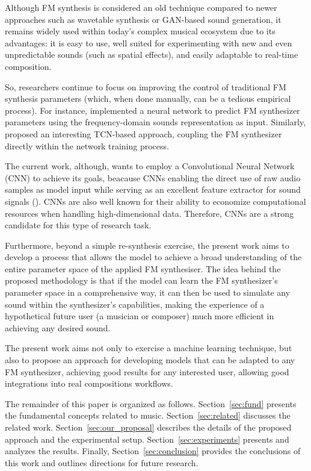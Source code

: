 \documentclass[sigconf,natbib=false]{acmart}
\begin{document}
Although FM synthesis is considered an old technique compared to newer approaches such as wavetable synthesis or GAN-based sound generation, it remains widely used within today’s complex musical ecosystem due to its advantages: it is easy to use, well suited for experimenting with new and even unpredictable sounds (such as spatial effects), and easily adaptable to real-time composition.

So, researchers continue to focus on improving the control of traditional FM synthesis parameters (which, when done manually, can be a tedious empirical process). For instance, \textcite{claesson2021resynthesis} implemented a neural network to predict FM synthesizer parameters using the frequency-domain sounds representation as input. Similarly, \textcite{steinmetz2022ddx7} proposed an interesting TCN-based approach, coupling the FM synthesizer directly within the network training process.

The current work, although, wants to employ a Convolutional Neural Network (CNN) to achieve its goals, beacause CNNs enabling the direct use of raw audio samples as model input while serving as an excellent feature extractor for sound signals (\textcite{kiranyaz2021survey}). CNNs are also well known for their ability to economize computational resources when handling high-dimensional data. Therefore, CNNs are a strong candidate for this type of research task.

Furthermore, beyond a simple re-synthesis exercise, the present work aims to develop a process that allows the model to achieve a broad understanding of the entire parameter space of the applied FM synthesiser. The idea behind the proposed methodology is that if the model can learn the FM synthesizer’s parameter space in a comprehensive way, it can then be used to simulate any sound within the synthesizer’s capabilities, making the experience of a hypothetical future user (a musician or composer) much more efficient in achieving any desired sound.

The present work aims not only to exercise a machine learning technique, but also to propose an approach for developing models that can be adapted to any FM synthesizer, achieving good results for any interested user, allowing good integrations into real compositions workflows.

The remainder of this paper is organized as follows. Section~\ref{sec:fund} presents the fundamental concepts related to music. Section~\ref{sec:related} discusses the related work. Section~\ref{sec:our_proposal} describes the details of the proposed approach and the experimental setup. Section~\ref{sec:experiments} presents and analyzes the results. Finally, Section~\ref{sec:conclusion} provides the conclusions of this work and outlines directions for future research.
\end{document}

